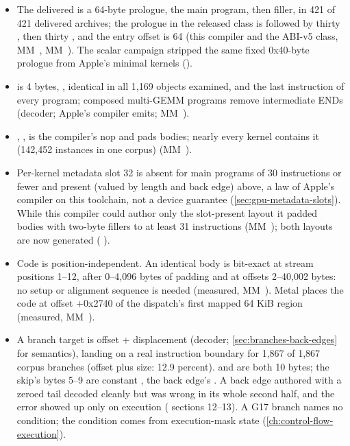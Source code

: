 \begin{itemize}
\item The delivered  is a 64-byte prologue, the main program, then filler, in 421 of 421
  delivered archives; the prologue in the released class is  followed by thirty ,  then thirty , and the entry offset is 64 (this compiler and the ABI-v5 class, MM~,
  MM~). The scalar campaign stripped the same fixed 0x40-byte prologue from Apple's minimal kernels
  ().
\item {} is 4 bytes, , identical in all 1,169 objects examined, and the last instruction
  of every program; composed multi-GEMM programs remove intermediate ENDs (decoder; Apple's compiler emits; MM~).
\item {}, , is the compiler's nop and pads bodies; nearly every kernel contains it
  (142,452 instances in one corpus) (MM~).
\item Per-kernel metadata slot 32 is absent for main programs of 30 instructions or fewer
  and present (valued by length and back edge) above, a law of Apple's compiler on this toolchain, not a device
  guarantee (\cref{sec:gpu-metadata-slots}). While this compiler could author only the slot-present layout it padded bodies with two-byte
  fillers to at least 31 instructions (MM~); both layouts are now generated ( ).
\item Code is position-independent. An identical body is bit-exact at stream positions 1–12, after 0–4,096 bytes of padding and
  at offsets 2–40,002 bytes: no setup or alignment sequence is needed (measured, MM~). Metal places the code at offset
  +0x2740 of the dispatch's first mapped 64 KiB region (measured, MM~).
\item A branch target is offset + displacement (decoder; \cref{sec:branches-back-edges} for semantics), landing on a real instruction
  boundary for 1,867 of 1,867 corpus branches (offset plus size: 12.9 percent).  and
   are both 10 bytes; the skip's bytes 5–9 are constant , the back
  edge's . A back edge authored with a zeroed tail decoded cleanly but was wrong in its whole second half, and
  the error showed up only on execution ( sections 12–13). A G17 branch names no condition; the condition comes from
  execution-mask state (\cref{ch:control-flow-execution}).
\end{itemize}

